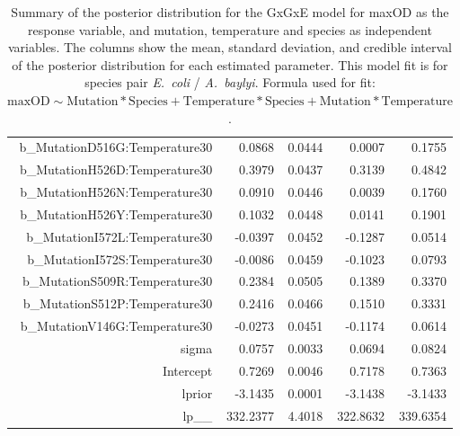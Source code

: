 \begin{table}[ht]
\begin{tabular}{rrrrr}
  b\_MutationD516G:Temperature30 & 0.0868 & 0.0444 & 0.0007 & 0.1755 \\ 
  b\_MutationH526D:Temperature30 & 0.3979 & 0.0437 & 0.3139 & 0.4842 \\ 
  b\_MutationH526N:Temperature30 & 0.0910 & 0.0446 & 0.0039 & 0.1760 \\ 
  b\_MutationH526Y:Temperature30 & 0.1032 & 0.0448 & 0.0141 & 0.1901 \\ 
  b\_MutationI572L:Temperature30 & -0.0397 & 0.0452 & -0.1287 & 0.0514 \\ 
  b\_MutationI572S:Temperature30 & -0.0086 & 0.0459 & -0.1023 & 0.0793 \\ 
  b\_MutationS509R:Temperature30 & 0.2384 & 0.0505 & 0.1389 & 0.3370 \\ 
  b\_MutationS512P:Temperature30 & 0.2416 & 0.0466 & 0.1510 & 0.3331 \\ 
  b\_MutationV146G:Temperature30 & -0.0273 & 0.0451 & -0.1174 & 0.0614 \\ 
  sigma & 0.0757 & 0.0033 & 0.0694 & 0.0824 \\ 
  Intercept & 0.7269 & 0.0046 & 0.7178 & 0.7363 \\ 
  lprior & -3.1435 & 0.0001 & -3.1438 & -3.1433 \\ 
  lp\_\_ & 332.2377 & 4.4018 & 322.8632 & 339.6354 \\ 
   \hline
\end{tabular}
\endgroup
\caption{Summary of the posterior distribution for the GxGxE model for maxOD as the response variable, and mutation, temperature and species as independent variables. The columns show the mean, standard deviation, and credible interval of the posterior distribution for each estimated parameter. This model fit is for species pair \textit{E.~coli} / \textit{A.~baylyi}. Formula used for fit: $\text{maxOD} \sim \text{Mutation} * \text{Species} + \text{Temperature} * \text{Species} + \text{Mutation} * \text{Temperature}$.} 
\label{supptab:GxGxe_no3way_maxOD}
\end{table}
